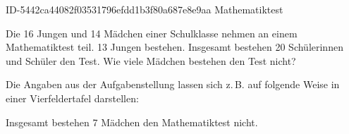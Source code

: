 \begin{exercise}
      {ID-5442ca44082f03531796efdd1b3f80a687e8e9aa}
      {Mathematiktest}
  \ifproblem\problem\par
    Die \num{16} Jungen und \num{14} Mädchen einer Schulklasse nehmen an einem
    Mathematiktest teil. \num{13} Jungen bestehen. Insgesamt bestehen \num{20}
    Schülerinnen und Schüler den Test. Wie viele Mädchen bestehen den
    Test nicht?
  \fi
  \ifoutline\outline\par
    Die Angaben aus der Aufgabenstellung lassen sich z.\,B. auf folgende
    Weise in einer Vierfeldertafel darstellen:
    \begin{center}
      \begin{fourfoldtable}
      \end{fourfoldtable}%
    \end{center}
  \fi
  \ifoutcome\outcome\par
    Insgesamt bestehen \num{7} Mädchen den Mathematiktest nicht.
    \begin{center}
      \begin{fourfoldtable}
      \end{fourfoldtable}%
    \end{center}
  \fi
\end{exercise}
